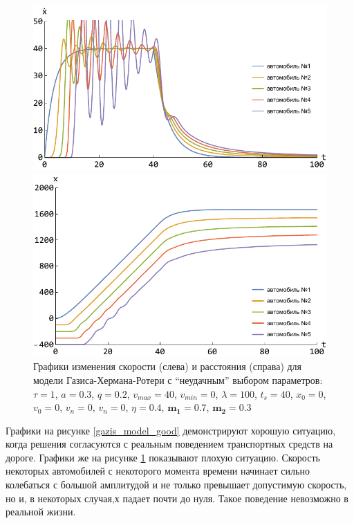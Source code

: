 \documentclass[12pt, a4paper]{extarticle}
\numberwithin{equation}{section}
\numberwithin{figure}{section}
\begin{document}
\begin{figure}[h!]
	\begin{center}
		\begin{minipage}[h!]{0.48\linewidth}
			\includegraphics[width=1\linewidth,height=0.2\textheight]
			{Images/gazis_model_bad_speed.pdf}
		\end{minipage}
		\hfill 
		\begin{minipage}[h!]{0.48\linewidth}
			\includegraphics[width=1\linewidth,height=0.2\textheight]
			{Images/gazis_model_bad_distance.pdf}
		\end{minipage}
		\caption{Графики изменения скорости (слева) и расстояния (справа) для модели Газиса-Хермана-Ротери с ``неудачным'' выбором параметров: $\tau=1$, $a=0.3$, $q=0.2$, $v_{max}=40$, $v_{min}=0$, $\lambda=100$, $t_s=40$, $x_0=0$, $v_0=0$, $v_n=0$, $v_n=0$, $\eta=0.4$, $\boldsymbol{m_1=0.7}$, $\boldsymbol{m_2=0.3}$}
		\label{gazis_model_bad}
	\end{center}
\end{figure}

Графики на рисунке \ref{gazis_model_good} демонстрируют хорошую ситуацию, когда решения согласуются с реальным поведением транспортных средств на дороге. Графики же на рисунке \ref{gazis_model_bad} показывают плохую ситуацию. Скорость некоторых автомобилей с некоторого момента времени начинает сильно колебаться с большой амплитудой и не только превышает допустимую скорость, но и, в некоторых случая,х падает почти до нуля. Такое поведение невозможно в реальной жизни.
\end{document}
